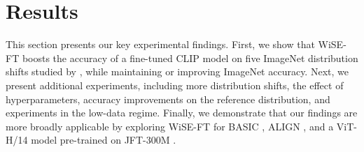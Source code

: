 \beforesec
\section{Results} 
\label{sec:results}
\postsec

This section presents our key experimental findings.
First, we show that WiSE-FT boosts the accuracy of a fine-tuned CLIP model on five ImageNet distribution shifts studied by \citet{radford2021learning}, while maintaining or improving ImageNet accuracy.
Next, we present additional experiments, including more distribution shifts, the effect of hyperparameters, accuracy improvements on the reference distribution, and experiments in the low-data regime. 
Finally, we demonstrate that our findings are more broadly applicable by exploring WiSE-FT for BASIC \cite{pham2021scaling}, ALIGN \cite{jia2021scaling}, and a ViT-H/14 \cite{dosovitskiy2021an} model pre-trained on JFT-300M \cite{sun2017revisiting}.

